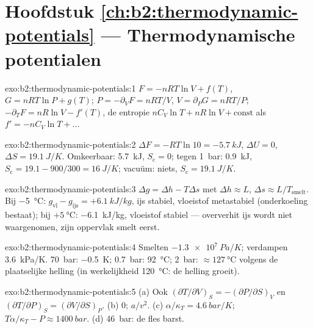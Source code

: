 \section*{Hoofdstuk \ref{ch:b2:thermodynamic-potentials} ---
Thermodynamische potentialen}

\begin{solution}{exo:b2:thermodynamic-potentials:1}
$F = -nRT\ln V + f(T)$, $G = nRT\ln P + g(T)$; $P = -\partial_VF = nRT/V$,
$V = \partial_PG = nRT/P$; $-\partial_TF = nR\ln V - f'(T)$, de entropie
$nC_V\ln T + nR\ln V + \text{const}$ als $f' = -nC_V\ln T + \dots$
\end{solution}

\begin{solution}{exo:b2:thermodynamic-potentials:2}
$\Delta F = -RT\ln 10 = \qty{-5.7}{kJ}$, $\Delta U = 0$,
$\Delta S = \qty{19.1}{J/K}$.
Omkeerbaar: \qty{5.7}{kJ}, $S_{\text{c}} = 0$; tegen \qty{1}{bar}: \qty{0.9}{kJ},
$S_{\text{c}} = 19.1 - 900/300 = \qty{16}{J/K}$; vacuüm: niets,
$S_{\text{c}} =
\qty{19.1}{J/K}$.
\end{solution}

\begin{solution}{exo:b2:thermodynamic-potentials:3}
$\Delta g = \Delta h - T\Delta s$ met $\Delta h \approx L$,
$\Delta s \approx L/T_{\text{smelt}}$.
Bij \qty{-5}{\celsius}: $g_{\text{vl}} - g_{\text{ijs}} = +\qty{6.1}{kJ/kg}$, ijs
stabiel, vloeistof metastabiel (onderkoeling bestaat); bij $+\qty{5}{\celsius}$:
\qty{-6.1}{kJ/kg}, vloeistof stabiel --- oververhit ijs wordt niet waargenomen, zijn
oppervlak smelt eerst.
\end{solution}

\begin{solution}{exo:b2:thermodynamic-potentials:4}
Smelten $\qty{-1.3e7}{Pa/K}$; verdampen \qty{3.6}{kPa/K}. \qty{70}{bar}:
\qty{-0.5}{K}; \qty{0.7}{bar}: \qty{92}{\celsius}; \qty{2}{bar}:
$\approx
\qty{127}{\celsius}$ volgens de plaatselijke helling (in
werkelijkheid \qty{120}{\celsius}: de
helling groeit).
\end{solution}

\begin{solution}{exo:b2:thermodynamic-potentials:5}
(a) Ook $(\partial T/\partial V)_S = -(\partial P/\partial S)_V$ en
$(\partial T/\partial P)_S = (\partial V/\partial S)_P$. (b) $0$; $a/v^2$. (c)
$\alpha/\kappa_T = \qty{4.6}{bar/K}$;
$T\alpha/\kappa_T - P \approx \qty{1400}{bar}$.
(d) \qty{46}{bar}: de fles barst.
\end{solution}

